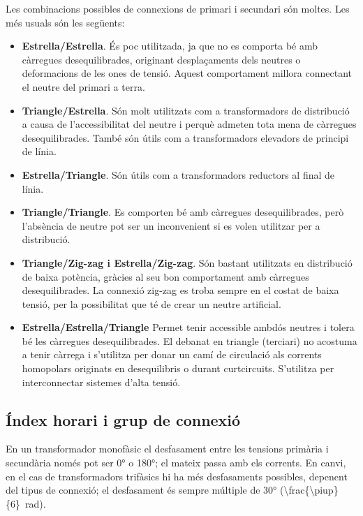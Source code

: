 Les combinacions possibles de connexions de primari i secundari són moltes. Les més usuals són les següents:
\begin{itemize}
   \item \textbf{Estrella/Estrella}. És poc utilitzada, ja que no es comporta bé amb càrregues desequilibrades, originant desplaçaments dels neutres o deformacions de les ones de tensió. Aquest comportament millora connectant el neutre del primari a terra.
   \item \textbf{Triangle/Estrella}. Són molt utilitzats com a transformadors de distribució a causa de l'accessibilitat del neutre i perquè admeten tota mena de càrregues desequilibrades. També són útils com a transformadors elevadors de principi de línia.
   \item \textbf{Estrella/Triangle}. Són útils com a transformadors reductors al final de línia.
   \item \textbf{Triangle/Triangle}. Es comporten bé amb càrregues desequilibrades, però l'absència de neutre pot ser un inconvenient si es volen utilitzar per a distribució.
   \item \textbf{Triangle/Zig-zag i Estrella/Zig-zag}. Són bastant utilitzats en distribució de baixa potència, gràcies al seu bon comportament amb càrregues desequilibrades. La connexió zig-zag es troba sempre en el costat de baixa tensió, per la possibilitat que té de crear un neutre artificial.
   \item \textbf{Estrella/Estrella/Triangle} Permet tenir accessible ambdós  neutres i tolera  bé les càrregues  desequilibrades. El debanat en triangle (terciari) no acostuma a tenir càrrega i s'utilitza per donar un camí de circulació als corrents homopolars originats en desequilibris o durant curtcircuits. S'utilitza per interconnectar sistemes d'alta tensió.
\end{itemize}


\subsection{Índex horari i grup de connexió}\label{sec:connex-index-horari}

En un transformador monofàsic el desfasament entre les tensions primària i secundària només pot ser \ang{0} o \ang{180}; el mateix passa amb els corrents. En canvi, en el cas de transformadors trifàsics hi ha més desfasaments possibles, depenent del tipus de connexió; el desfasament és sempre múltiple de \ang{30} 
(\qty[parse-numbers=false]{\frac{\piup}{6}}{rad}).

